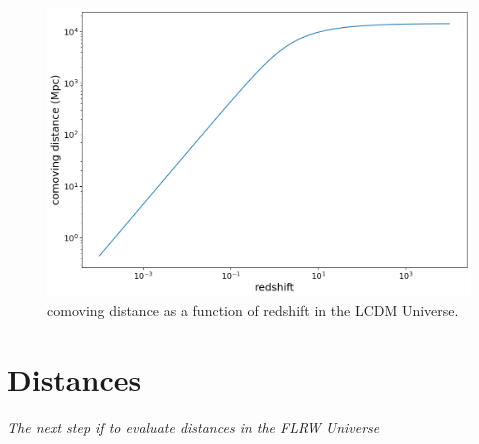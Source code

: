 \documentclass[a4paper, 11pt]{article}
\begin{document}
\begin{figure}
  \centering
  \includegraphics[width=0.7\columnwidth]{comoving_distance.png}
  \caption{comoving distance as a function of redshift in the LCDM Universe.}
  \label{fig:comov}
\end{figure}


\section{Distances}

{\it The next step if to evaluate distances in the FLRW Universe}  \\
\end{document}
